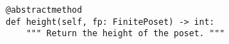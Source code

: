 \par\begin{minipage}{60ex}
\begin{verbatim}
@abstractmethod
def height(self, fp: FinitePoset) -> int:
    """ Return the height of the poset. """
\end{verbatim}
\end{minipage}\par